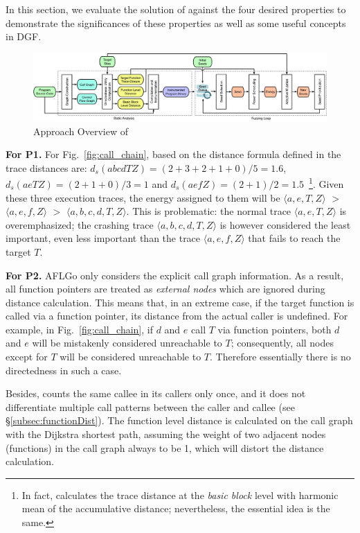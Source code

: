 In this section, we evaluate the solution of \aflgo against the four desired properties to demonstrate the significances of these properties as well as some useful concepts in DGF.





\begin{figure}[ht]
	\includegraphics[width=.98\columnwidth]{res/dfot/overview.pdf}
	\caption{Approach Overview of \dFOT}
	\label{fig:overview}
\end{figure}

\textbf{For P1.} 
For Fig.~\ref{fig:call_chain}, based on the distance formula defined in \aflgo
the trace distances are:  $d_s(abcdTZ)=(2+3+2+1+0)/5=1.6$, $d_s(aeTZ)=(2+1+0)/3=1$ and $d_s(aefZ)=(2+1)/2=1.5$~\footnote{In fact, \aflgo calculates the trace distance at the \emph{basic block} level with harmonic mean of the accumulative distance; nevertheless, the essential idea is the same.}. 
Given these three execution traces, the energy assigned to them will be $ \langle a, e, T, Z\rangle$ $>$ $\langle a, e, f , Z\rangle$ $>$ $\langle a, b, c, d, T, Z\rangle$.
This is problematic: the normal trace $\langle a, e, T, Z\rangle $ is overemphasized; the crashing trace $\langle a, b, c, d, T, Z\rangle$ is however considered the least important, even less important than the trace $\langle a, e, f , Z\rangle$ that fails to reach the target $T$.



\textbf{For P2.} AFLGo only considers the explicit call graph information.
As a result, all function pointers are treated as \emph{external nodes} which 
are ignored during distance calculation. 
This means that, in an extreme case, if the target function is called via a function pointer, its distance from the actual caller is undefined. 
For example, in Fig.~\ref{fig:call_chain}, if $d$ and $e$ call $T$ via function pointers, both $d$ and $e$ will be mistakenly considered unreachable to $T$; consequently, all nodes except for $T$ will be considered unreachable to $T$. Therefore essentially there is no directedness in such a case.


Besides, \aflgo counts the same callee in its callers only once, and it does not differentiate multiple call patterns between the caller and callee (see \S\ref{subsec:functionDist}).
The function level distance is calculated on the call graph with the Dijkstra shortest path, assuming the weight of two adjacent nodes (functions) in the call graph always to be 1, which will distort the distance calculation. 


